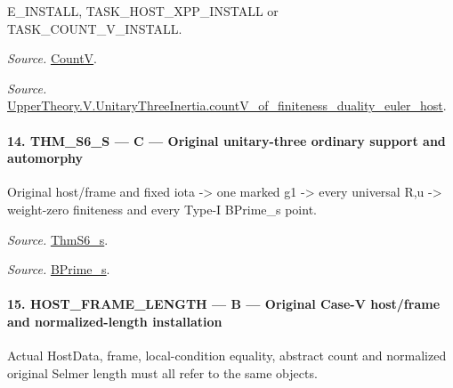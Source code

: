 \documentclass[11pt,a4paper]{article}
\numberwithin{equation}{section}
\theoremstyle{remark}\newtheorem{remark}[theorem]{Remark}
\begin{document}
E\_\allowbreak INSTALL, TASK\_\allowbreak HOST\_\allowbreak XPP\_\allowbreak INSTALL or TASK\_\allowbreak COUNT\_\allowbreak V\_\allowbreak INSTALL.

\emph{Source.} \href{https://github.com/CocoSgt/riemann-hypothesis-lean/blob/7cbf7a0c32fca1badf05931879a37c3f8a2b03b4/src/Development/AutomorphicArithmetic/AutomorphicVarieties/HeightAndVanishing/Counts.lean#L69-L69}{CountV}.

\emph{Source.} \href{https://github.com/CocoSgt/riemann-hypothesis-lean/blob/7cbf7a0c32fca1badf05931879a37c3f8a2b03b4/src/Development/AutomorphicArithmetic/AutomorphicVarieties/ModularityArgument/ThresholdArguments/DenseThresholdCases/CountVOf.lean#L33-L60}{UpperTheory.V.UnitaryThreeInertia.countV\_\allowbreak of\_\allowbreak finiteness\_\allowbreak duality\_\allowbreak euler\_\allowbreak host}.



\paragraph{14. THM\_\allowbreak S6\_\allowbreak S — C — Original unitary-three ordinary support and automorphy}

Original host/frame and fixed iota -> one marked g1 -> every universal R,u -> weight-zero finiteness and every Type-I BPrime\_\allowbreak s point.

\emph{Source.} \href{https://github.com/CocoSgt/riemann-hypothesis-lean/blob/7cbf7a0c32fca1badf05931879a37c3f8a2b03b4/src/Development/AutomorphicArithmetic/AutomorphicVarieties/ModularityArgument/ThresholdArguments/DenseThresholdCases/ThmS6CoreS.lean#L17-L26}{ThmS6\_\allowbreak s}.

\emph{Source.} \href{https://github.com/CocoSgt/riemann-hypothesis-lean/blob/7cbf7a0c32fca1badf05931879a37c3f8a2b03b4/src/Development/AutomorphicArithmetic/AutomorphicVarieties/ModularityArgument/ThresholdArguments/DenseThresholdCases/ThmS6CoreS.lean#L12-L16}{BPrime\_\allowbreak s}.



\paragraph{15. HOST\_\allowbreak FRAME\_\allowbreak LENGTH — B — Original Case-V host/frame and normalized-length installation}

Actual HostData, frame, local-condition equality, abstract count and normalized original Selmer length must all refer to the same objects.
\end{document}
